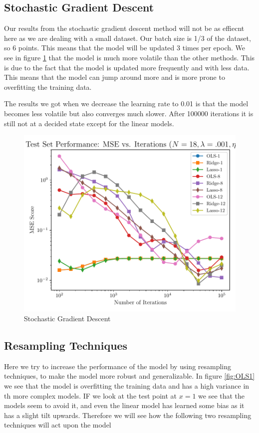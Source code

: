 \documentclass[amssymb,twocolumn,aps]{revtex4}
\begin{document}
\subsection{Stochastic Gradient Descent}
Our results from the stochastic gradient descent method will not be as effiecnt here as we are dealing with a small dataset.
Our batch size is 1/3 of the dataset, so 6 points.
This means that the model will be updated 3 times per epoch.
We see in figure \ref{fig:GradSGD} that the model is much more volatile than the other methods.
This is due to the fact that the model is updated more frequently and with less data.
This means that the model can jump around more and is more prone to overfitting the training data.

The results we got when we decrease the learning rate to 0.01 is that the model becomes less volatile but also converges much slower.
After 100000 iterations it is still not at a decided state except for the linear models.
\\



\begin{figure}[h]
    \centering
    \includegraphics[width=.95 \linewidth]{Figures/StochasticDescent.pdf}
    \caption{Stochastic Gradient Descent}
    \label{fig:GradSGD}
\end{figure}
\subsection{Resampling Techniques}
Here we try to increase the performance of the model by using resampling techniques, to make the model more robust and generalizable.
In figure \ref{fig:OLS1} we see that the model is overfitting the training data and has a high variance in th more complex models.
IF we look at the test point at $x=1$ we see that the models seem to avoid it, and even the linear model has learned some bias as it has a slight tilt upwards.
Therefore we will see how the following two resampling techniques will act upon the model 
\end{document}
